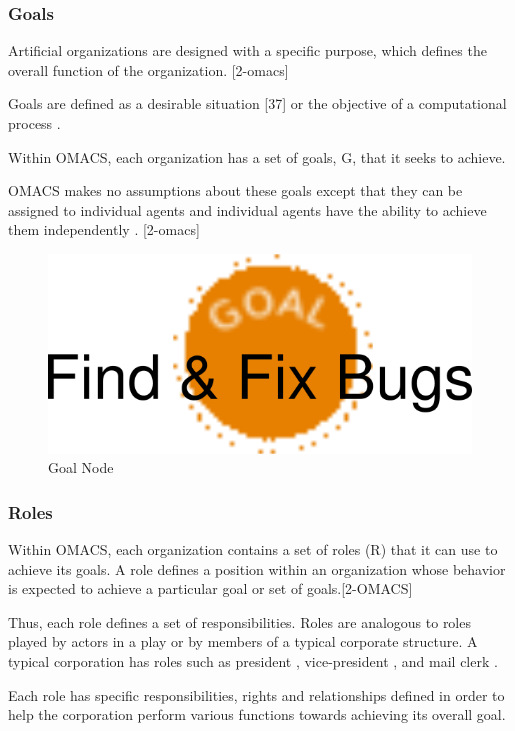 \subsubsection{Goals}

Artificial organizations are designed with a specific purpose, which defines the overall function
of the organization. [2-omacs]

Goals are defined as a desirable situation [37] or the objective of a
computational process .

Within OMACS, each organization has a set of goals, G, that it seeks
to achieve.

OMACS makes no assumptions about these goals except that they can be assigned to
individual agents and individual agents have the ability to achieve them independently . [2-omacs]

\begin{figure}[th]
	\centering
		\includegraphics{chapiter1/img/Goal}
	\caption{\label{fig:Goal Node}Goal Node }
\end{figure}

\subsubsection{Roles } 

Within OMACS, each organization contains a set of roles (R) that it can use to achieve its goals.
A role defines a position within an organization whose behavior is expected to achieve a
particular goal or set of goals.[2-OMACS]

Thus, each role defines a set of responsibilities. Roles are
analogous to roles played by actors in a play or by members of a typical corporate structure. A
typical corporation has roles such as  president ,  vice-president , and  mail clerk .  

Each role has specific responsibilities, rights and relationships defined in order to help the corporation
perform various functions towards achieving its overall goal. 


